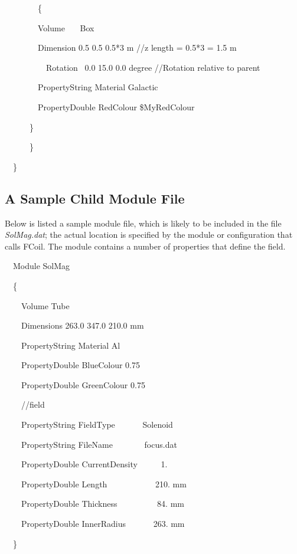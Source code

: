 {\ttfamily
\ \ \ \ \ \ \ \ \{}

{\ttfamily
\ \ \ \ \ \ \ \ Volume \ \ \ Box}

{\ttfamily
\ \ \ \ \ \ \ \ Dimension 0.5 0.5 0.5*3 m //z length = 0.5*3 = 1.5 m}

{\ttfamily
\ \ \ \ \ \ \ \ \ \ Rotation \ 0.0 15.0 0.0 degree //Rotation relative to parent}

{\ttfamily
\ \ \ \ \ \ \ \ PropertyString Material Galactic}

{\ttfamily
\ \ \ \ \ \ \ \ PropertyDouble RedColour \$MyRedColour}

{\ttfamily
\ \ \ \ \ \ \}}

{\ttfamily
\ \ \ \ \ \ \}}

\ \ \}

\clearpage\subsection{A Sample Child Module File}
Below is listed a sample module file, which is likely to be included in the file \textit{SolMag.dat}; the actual
location is specified by the module or configuration that calls FCoil. The module contains a number of properties that
define the field.

{\ttfamily
\ \ Module SolMag}

{\ttfamily
\ \ \{}

{\ttfamily
\ \ \ \ Volume Tube }

{\ttfamily
\ \ \ \ Dimensions 263.0 347.0 210.0 mm}

{\ttfamily
\ \ \ \ PropertyString Material Al}

{\ttfamily
\ \ \ \ PropertyDouble BlueColour 0.75}

{\ttfamily
\ \ \ \ PropertyDouble GreenColour 0.75}

{\ttfamily
\ \ \ \ //field}

{\ttfamily
\ \ \ \ PropertyString FieldType \ \ \ \ \ \ Solenoid}

{\ttfamily
\ \ \ \ PropertyString FileName \ \ \ \ \ \ \ focus.dat}

{\ttfamily
\ \ \ \ PropertyDouble CurrentDensity \ \ \ \ \ 1.}

{\ttfamily
\ \ \ \ PropertyDouble Length \ \ \ \ \ \ \ \ \ \ \ 210. mm}

{\ttfamily
\ \ \ \ PropertyDouble Thickness \ \ \ \ \ \ \ \ \ 84. mm}

{\ttfamily
\ \ \ \ PropertyDouble InnerRadius \ \ \ \ \ \ 263. mm}

{\ttfamily
\ \ \}}
